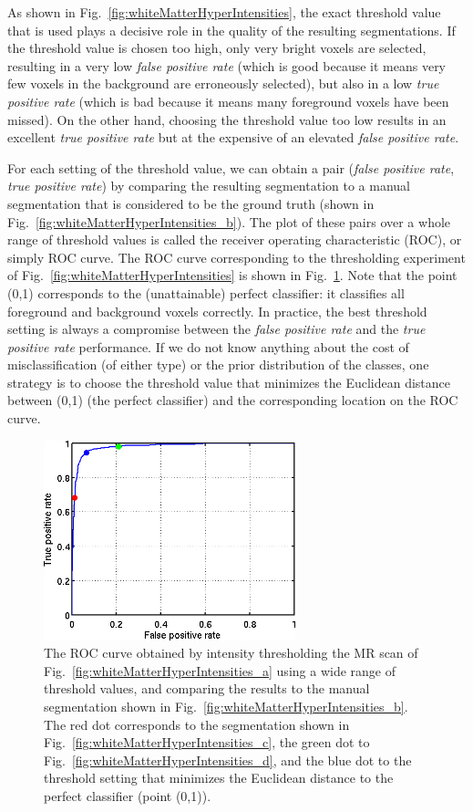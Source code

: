 \documentclass[10pt,twoside]{book}
\begin{document}
As shown in Fig.~\ref{fig:whiteMatterHyperIntensities}, the exact 
threshold value that is used plays a decisive role in the quality of the resulting segmentations. If the threshold value is chosen too high, 
only very bright voxels are selected, resulting in a very low \emph{false positive rate} (which is good because it means very few voxels in the background are erroneously selected),
but also in a low \emph{true positive rate} (which is bad because it means many foreground voxels have been missed).
On the other hand, choosing the threshold value too low results in an excellent \emph{true positive rate} but at the expensive of an elevated \emph{false positive rate}.

For each setting of the threshold value, we can obtain a pair (\emph{false positive rate}, \emph{true positive rate}) by comparing the resulting segmentation to a manual segmentation 
that is considered to be the ground truth (shown in Fig.~\ref{fig:whiteMatterHyperIntensities_b}). The plot of these pairs over a whole range of threshold values
is called the receiver operating characteristic (ROC), or simply ROC curve. The ROC curve corresponding to the thresholding experiment of Fig.~\ref{fig:whiteMatterHyperIntensities} is shown in Fig.~\ref{fig:ROC}. Note that the 
point (0,1) corresponds to the (unattainable) perfect classifier: it classifies all foreground and background voxels correctly. In practice, the best threshold setting is always a compromise between 
the \emph{false positive rate} and the \emph{true positive rate} performance. If we do not know 
anything about the cost of misclassification (of either type) or the prior distribution of the classes, one strategy is to choose the threshold value that minimizes the
Euclidean distance between (0,1) (the perfect classifier) and the corresponding location on the ROC curve.

\begin{figure}
  \centering
  \includegraphics[width=0.65\textwidth]{rocCurve}
  \caption{The ROC curve obtained by intensity thresholding the MR scan of Fig.~\ref{fig:whiteMatterHyperIntensities_a} using a wide range of threshold values, and comparing the results to the manual segmentation shown in Fig.~\ref{fig:whiteMatterHyperIntensities_b}. The red dot corresponds to the segmentation shown in Fig.~\ref{fig:whiteMatterHyperIntensities_c}, the green dot to Fig.~\ref{fig:whiteMatterHyperIntensities_d}, and the blue dot to the threshold setting that minimizes the Euclidean distance to the perfect classifier (point (0,1)).}
  \label{fig:ROC}
\end{figure}
\end{document}
